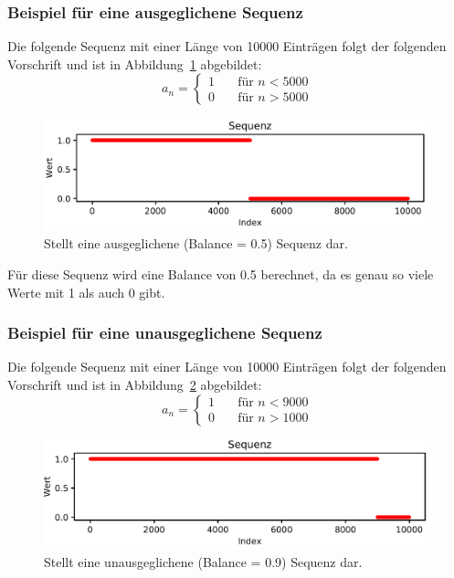 \subsubsection{Beispiel für eine ausgeglichene Sequenz}
Die folgende Sequenz mit einer Länge von 10000 Einträgen folgt der folgenden Vorschrift und ist in Abbildung~\ref{fig:example_balance_equal} abgebildet:
\[ a_{n} =
\begin{cases}
1       & \quad \text{für } n < 5000\\
0  		& \quad \text{für } n > 5000
\end{cases}
\]

\begin{figure}[H]
	\includegraphics[width=\linewidth]{pythonImplementation/images/example_balance_equal.PNG}
	\caption[Darstellung einer ausgeglichenen Sequenz]{Stellt eine ausgeglichene (Balance = 0.5) Sequenz dar\footnotemark.}
	\label{fig:example_balance_equal}
\end{figure}

Für diese Sequenz wird eine Balance von 0.5 berechnet, da es genau so viele Werte mit 1 als auch 0 gibt. 
\subsubsection{Beispiel für eine unausgeglichene Sequenz}
Die folgende Sequenz mit einer Länge von 10000 Einträgen folgt der folgenden Vorschrift und ist in Abbildung~\ref{fig:example_balance_unequal} abgebildet:
\[ a_{n} =
\begin{cases}
1       & \quad \text{für } n < 9000\\
0  		& \quad \text{für } n > 1000
\end{cases}
\]

\begin{figure}[H]
	\includegraphics[width=\linewidth]{pythonImplementation/images/example_balance_unequal.PNG}
	\caption[Darstellung einer unausgeglichenen Sequenz]{Stellt eine unausgeglichene (Balance = 0.9) Sequenz dar\footnotemark.}
	\label{fig:example_balance_unequal}
\end{figure}

